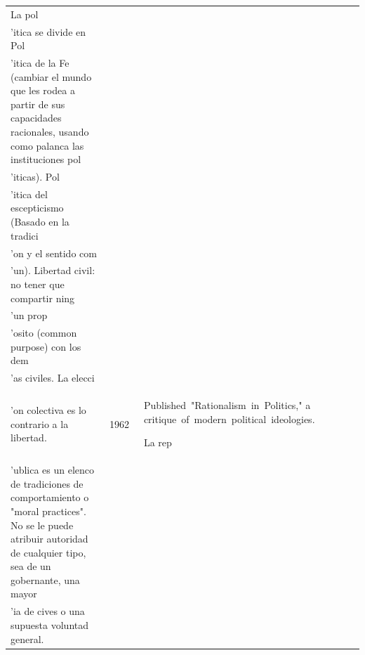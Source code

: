 \documentclass[
  letterpaper,
  DIV=11,
  numbers=noendperiod]{scrreprt}
\begin{document}
\begin{table}
\begin{tabular*}{\linewidth}{@{\extracolsep{\fill}}lllllc}
La pol\\'itica se divide en Pol\\'itica de la Fe (cambiar el mundo que les rodea a partir de sus capacidades racionales, usando como palanca las instituciones pol\\'iticas). Pol\\'itica del escepticismo (Basado en la tradici\\'on y el sentido com\\'un). Libertad civil: no tener que compartir ning\\'un prop\\'osito (common purpose) con los dem\\'as civiles. La elecci\\'on colectiva es lo contrario a la libertad. & 1962  & Published "Rationalism in Politics," a critique of modern political ideologies. 

La rep\\'ublica es un elenco de tradiciones de comportamiento o "moral practices". No se le puede atribuir autoridad de cualquier tipo, sea de un gobernante, una mayor\\'ia de cives o una supuesta voluntad general.


\end{tabular*}
\end{table}
\end{document}
